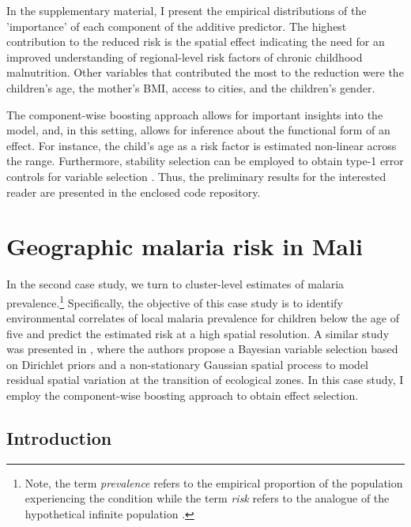 In the supplementary material, I present the empirical distributions of the 'importance' of each component of the additive predictor. The highest contribution to the reduced risk is the spatial effect indicating the need for an improved understanding of regional-level risk factors of chronic childhood malnutrition. Other variables that contributed the most to the reduction were the children's age, the mother's BMI, access to cities, and the children's gender. 

The component-wise boosting approach allows for important insights into the model, and, in this setting, allows for inference about the functional form of an effect. For instance, the child's age as a risk factor is estimated non-linear across the range. Furthermore, stability selection can be employed to obtain type-1 error controls for variable selection \autocite{meinshausenStabilitySelectionStability2010, shahVariableSelectionError2013}. Thus, the preliminary results for the interested reader are presented in the enclosed code repository.



\section{Geographic malaria risk in Mali}\label{sec:geographic-malaria-risk-in-mali}

In the second case study, we turn to cluster-level estimates of malaria prevalence.\footnote{Note, the term \textit{prevalence} refers to the empirical proportion of the population experiencing the condition while the term \textit{risk} refers to the analogue of the hypothetical infinite population \autocite{fuglstadTwoCulturesPrevalence2022}.} Specifically, the objective of this case study is to identify environmental correlates of local malaria prevalence for children below the age of five and predict the estimated risk at a high spatial resolution. A similar study was presented in \textcite{giardinaBayesianVariableSelection2016}, where the authors propose a Bayesian variable selection based on Dirichlet priors and a non-stationary Gaussian spatial process to model residual spatial variation at the transition of ecological zones. In this case study, I employ the component-wise boosting approach to obtain effect selection.  


\subsection{Introduction}

